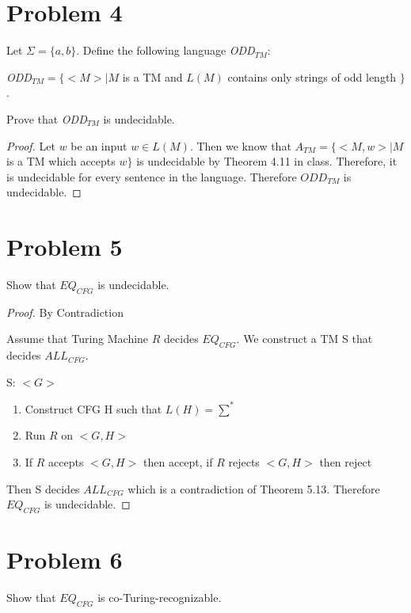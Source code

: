\documentclass[11pt]{article}
\begin{document}
\newpage
\section*{Problem 4}

Let $\Sigma=\{a,b\}$. Define the following language {\em ODD}$_{TM}$:

{\em ODD}$_{TM}=\{ <M>|M$ is a TM and $L(M)$ contains only strings of odd length $\}$.

Prove that {\em ODD}$_{TM}$ is undecidable.



\begin{proof}

Let $w$ be an input $w \in L(M)$. Then we know that $A_{TM} = \{<M, w> | M$ is a TM which accepts $w \}$ is undecidable by Theorem 4.11 in class. Therefore, it is undecidable for every sentence in the language. Therefore $ODD_{TM}$ is undecidable.
\end{proof}


\newpage
\section*{Problem 5}

Show that $EQ_{CFG}$ is undecidable.
\newline

\begin{proof} By Contradiction

Assume that Turing Machine $R$ decides $EQ_{CFG}$. We construct a TM S that decides $ALL_{CFG}$.

S: $<G>$
\begin{enumerate}[1.]
	\item Construct CFG H such that $L(H) = \sum^*$
	\item Run $R$ on $<G, H>$
	\item If $R$ accepts $<G, H>$ then accept, if $R$ rejects $<G,H>$ then reject
\end{enumerate}

Then S decides $ALL_{CFG}$ which is a contradiction of Theorem 5.13. Therefore $EQ_{CFG}$ is undecidable. 

\end{proof}



\newpage
\section*{Problem 6}

Show that $EQ_{CFG}$ is co-Turing-recognizable.
\newline
\end{document}
